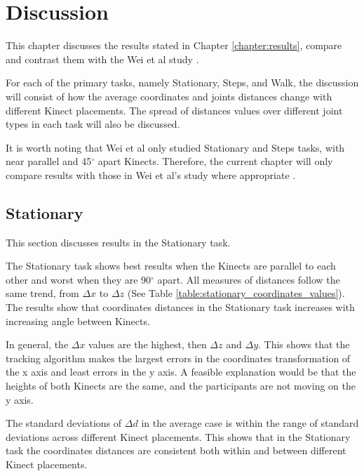


\chapter{Discussion}

\label{chapter:discussion}

This chapter discusses the results stated in Chapter \ref{chapter:results}, compare and contrast them with the Wei et al study \cite{wei_kinect_calibration}.

For each of the primary tasks, namely Stationary, Steps, and Walk, the discussion will consist of how the average coordinates and joints distances change with different Kinect placements. The spread of distances values over different joint types in each task will also be discussed.

It is worth noting that Wei et al only studied Stationary and Steps tasks, with near parallel and 45$^{\circ}$ apart Kinects. Therefore, the current chapter will only compare results with those in Wei et al's study where appropriate \cite{wei_kinect_calibration}.

\section{Stationary}
\label{sec:discussion_stationary}

This section discusses results in the Stationary task.

The Stationary task shows best results when the Kinects are parallel to each other and worst when they are 90$^{\circ}$ apart. All measures of distances follow the same trend, from $\Delta x$ to $\Delta z$ (See Table \ref{table:stationary_coordinates_values}). The results show that coordinates distances in the Stationary task increases with increasing angle between Kinects.

In general, the $\Delta x$ values are the highest, then $\Delta z$ and $\Delta y$. This shows that the tracking algorithm makes the largest errors in the coordinates transformation of the x axis and least errors in the y axis. A feasible explanation would be that the heights of both Kinects are the same, and the participants are not moving on the y axis.

The standard deviations of $\Delta d$ in the average case is within the range of standard deviations across different Kinect placements. This shows that in the Stationary task the coordinates distances are consistent both within and between different Kinect placements.

